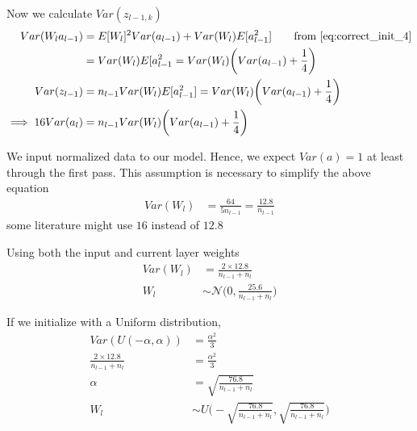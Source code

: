 \documentclass[../../deep_learning_notes.tex]{subfiles}
\begin{document}
Now we calculate $Var(z_{l-1, k})$
\begin{align*}
    Var(W_{l} a_{l-1}) &= E[W_{l}]^{2}Var(a_{l-1}) + Var(W_{l})E[a_{l-1}^{2}] \tag*{\text{from} \eqref{eq:correct_init_4}}\\
    &= Var(W_{l})E[a_{l-1}^{2} = Var(W_{l}) \bigg(Var(a_{l-1}) + \frac{1}{4} \bigg)\\
    Var(z_{l-1}) &= n_{l-1}Var(W_{l})E[a_{l-1}^{2}] = Var(W_{l}) \bigg(Var(a_{l-1}) + \frac{1}{4} \bigg)\\
    \implies 16 Var(a_{l}) &= n_{l-1} Var(W_{l}) \bigg(Var(a_{l-1}) + \frac{1}{4} \bigg)
\end{align*}

We input normalized data to our model. Hence, we expect $Var(a) = 1$ at least through the first pass. This assumption is necessary to simplify the above equation
\begin{align*}
    Var(W_{l}) &= \frac{64}{5 n_{l-1}} = \frac{12.8}{n_{l-1}}
\end{align*}
some literature might use $16$ instead of $12.8$\newline

Using both the input and current layer weights
\begin{align*}
    Var(W_{l}) &= \frac{2 \times 12.8}{n_{l-1} + n_{l}}\\
    W_{l} &\sim \mathcal{N} \bigg(0, \frac{25.6}{n_{l-1} + n_{l}} \bigg)
\end{align*}

If we initialize with a Uniform distribution,
\begin{align*}
    Var(U(-\alpha, \alpha)) &= \frac{\alpha^{2}}{3}\\
    \frac{2 \times 12.8}{n_{l-1} + n_{l}} &= \frac{\alpha^{2}}{3}\\
    \alpha &= \sqrt{\frac{76.8}{n_{l-1} + n_{l}}}\\
    W_{l} &\sim U\bigg(-\sqrt{\frac{76.8}{n_{l-1} + n_{l}}}, \sqrt{\frac{76.8}{n_{l-1} + n_{l}}} \bigg)
\end{align*}


\end{document}
